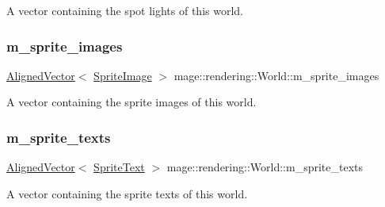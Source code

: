 A vector containing the spot lights of this world. \hypertarget{classmage_1_1rendering_1_1_world_ae407a779908a300c6c979fd0e11c1471}{}\label{classmage_1_1rendering_1_1_world_ae407a779908a300c6c979fd0e11c1471} 
\subsubsection{\texorpdfstring{m\+\_\+sprite\+\_\+images}{m\_sprite\_images}}
{\footnotesize\ttfamily \hyperlink{namespacemage_a8664bfb5ce2179fc64eae9f82c8a5ba8}{Aligned\+Vector}$<$ \hyperlink{classmage_1_1rendering_1_1_sprite_image}{Sprite\+Image} $>$ mage\+::rendering\+::\+World\+::m\+\_\+sprite\+\_\+images\hspace{0.3cm}{\ttfamily [private]}}

A vector containing the sprite images of this world. \hypertarget{classmage_1_1rendering_1_1_world_a6d3d85a9a5d13e6ba74d56ace106a865}{}\label{classmage_1_1rendering_1_1_world_a6d3d85a9a5d13e6ba74d56ace106a865} 
\subsubsection{\texorpdfstring{m\+\_\+sprite\+\_\+texts}{m\_sprite\_texts}}
{\footnotesize\ttfamily \hyperlink{namespacemage_a8664bfb5ce2179fc64eae9f82c8a5ba8}{Aligned\+Vector}$<$ \hyperlink{classmage_1_1rendering_1_1_sprite_text}{Sprite\+Text} $>$ mage\+::rendering\+::\+World\+::m\+\_\+sprite\+\_\+texts\hspace{0.3cm}{\ttfamily [private]}}

A vector containing the sprite texts of this world. 